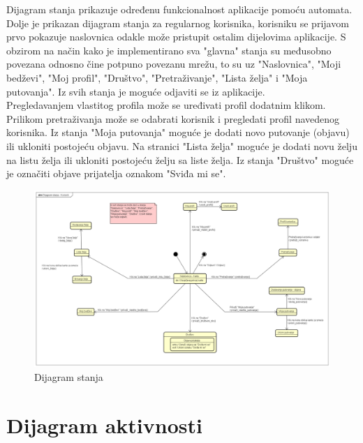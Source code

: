             Dijagram stanja prikazuje određenu funkcionalnost aplikacije pomoću automata. Dolje je prikazan dijagram stanja za regularnog korisnika, korisniku se prijavom prvo pokazuje naslovnica odakle može pristupit ostalim dijelovima aplikacije. S obzirom na način kako je implementirano sva "glavna" stanja su međusobno povezana odnosno čine potpuno povezanu mrežu, to su uz "Naslovnica", "Moji bedževi", "Moj profil", "Društvo", "Pretraživanje", "Lista želja" i "Moja putovanja". Iz svih stanja je moguće odjaviti se iz aplikacije. 
            \\
            Pregledavanjem vlastitog profila može se uređivati profil dodatnim klikom.
            Prilikom pretraživanja može se odabrati korisnik i pregledati profil navedenog korisnika.
            Iz stanja "Moja putovanja" moguće je dodati novo putovanje (objavu) ili ukloniti postojeću objavu.
            Na stranici "Lista želja" moguće je dodati novu želju na listu želja ili ukloniti postojeću želju sa liste želja.
            Iz stanja "Društvo" moguće je označiti objave prijatelja oznakom "Sviđa mi se".
            
            
                \begin{figure}[H]
        		\includegraphics[scale=0.25]{slike/Dijagram stanja - Korisnik.png} %
        		  \centering
        		\caption{Dijagram stanja }

        	\end{figure}


			\eject

		\section{Dijagram aktivnosti}

